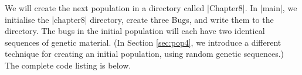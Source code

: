 We will create the next population in a directory called |Chapter8|.
In |main|, we initialise the |chapter8| directory, create three Bugs,
and write them to the directory.
The bugs in the initial population will each have two identical
sequences of genetic material.
(In Section \ref{sec:pop4}, we introduce a different technique for creating
an initial population, using random genetic sequences.)
The complete code listing is below.


